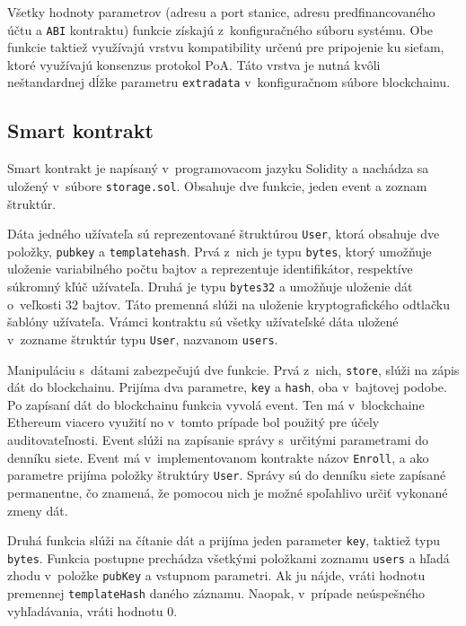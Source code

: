 Všetky hodnoty parametrov (adresu a port stanice, adresu predfinancovaného účtu a \texttt{ABI} kontraktu) funkcie získajú z~konfiguračného súboru systému. Obe funkcie taktiež využívajú vrstvu kompatibility určenú pre pripojenie ku sieťam, ktoré využívajú konsenzus protokol PoA. Táto vrstva je nutná kvôli neštandardnej dĺžke parametru \texttt{extradata} v~konfiguračnom súbore blockchainu.

\subsection{Smart kontrakt}
Smart kontrakt je napísaný v~programovacom jazyku Solidity a nachádza sa uložený v~súbore \texttt{storage.sol}. Obsahuje dve funkcie, jeden event a zoznam štruktúr.

Dáta jedného užívateľa sú reprezentované štruktúrou \texttt{User}, ktorá obsahuje dve položky, \texttt{pubkey} a \texttt{templatehash}. Prvá z~nich je typu \texttt{bytes}, ktorý umožňuje uloženie variabilného počtu bajtov a reprezentuje identifikátor, respektíve súkromný kľúč užívateľa. Druhá je typu \texttt{bytes32} a umožňuje uloženie dát o~veľkosti 32 bajtov. Táto premenná slúži na uloženie kryptografického odtlačku šablóny užívateľa. Vrámci kontraktu sú všetky užívateľské dáta uložené v~zozname štruktúr typu \texttt{User}, nazvanom \texttt{users}.

Manipuláciu s~dátami zabezpečujú dve funkcie. Prvá z~nich, \texttt{store}, slúži na zápis dát do blockchainu. Prijíma dva parametre, \texttt{key} a \texttt{hash}, oba v~bajtovej podobe. Po zapísaní dát do blockchainu funkcia vyvolá event. Ten má v~blockchaine Ethereum viacero využití no v~tomto prípade bol použitý pre účely auditovateľnosti. Event slúži na zapísanie správy s~určitými parametrami do denníku siete. Event má v~implementovanom kontrakte názov \texttt{Enroll}, a ako parametre prijíma položky štruktúry \texttt{User}. Správy sú do denníku siete zapísané permanentne, čo znamená, že pomocou nich je možné spoľahlivo určiť vykonané zmeny dát.

Druhá funkcia slúži na čítanie dát a prijíma jeden parameter \texttt{key}, taktiež typu \texttt{bytes}. Funkcia postupne prechádza všetkými položkami zoznamu \texttt{users} a hľadá zhodu v~položke \texttt{pubKey} a vstupnom parametri. Ak ju nájde, vráti hodnotu premennej \texttt{templateHash} daného záznamu. Naopak, v~prípade neúspešného vyhľadávania, vráti hodnotu 0.

